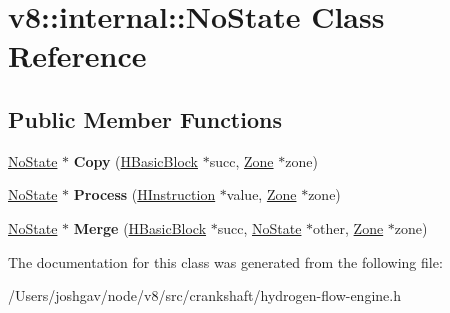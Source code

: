 \hypertarget{classv8_1_1internal_1_1_no_state}{}\section{v8\+:\+:internal\+:\+:No\+State Class Reference}
\label{classv8_1_1internal_1_1_no_state}
\subsection*{Public Member Functions}
\begin{DoxyCompactItemize}
\item 
\hyperlink{classv8_1_1internal_1_1_no_state}{No\+State} $\ast$ {\bfseries Copy} (\hyperlink{classv8_1_1internal_1_1_h_basic_block}{H\+Basic\+Block} $\ast$succ, \hyperlink{classv8_1_1internal_1_1_zone}{Zone} $\ast$zone)\hypertarget{classv8_1_1internal_1_1_no_state_aaadf2e07f1ad0411e869b0bbaf6b0c9e}{}\label{classv8_1_1internal_1_1_no_state_aaadf2e07f1ad0411e869b0bbaf6b0c9e}

\item 
\hyperlink{classv8_1_1internal_1_1_no_state}{No\+State} $\ast$ {\bfseries Process} (\hyperlink{classv8_1_1internal_1_1_h_instruction}{H\+Instruction} $\ast$value, \hyperlink{classv8_1_1internal_1_1_zone}{Zone} $\ast$zone)\hypertarget{classv8_1_1internal_1_1_no_state_a875e115daa326ce075cd255a56c4e999}{}\label{classv8_1_1internal_1_1_no_state_a875e115daa326ce075cd255a56c4e999}

\item 
\hyperlink{classv8_1_1internal_1_1_no_state}{No\+State} $\ast$ {\bfseries Merge} (\hyperlink{classv8_1_1internal_1_1_h_basic_block}{H\+Basic\+Block} $\ast$succ, \hyperlink{classv8_1_1internal_1_1_no_state}{No\+State} $\ast$other, \hyperlink{classv8_1_1internal_1_1_zone}{Zone} $\ast$zone)\hypertarget{classv8_1_1internal_1_1_no_state_a24c4643d3bf9434eb6da2fbda08791ab}{}\label{classv8_1_1internal_1_1_no_state_a24c4643d3bf9434eb6da2fbda08791ab}

\end{DoxyCompactItemize}


The documentation for this class was generated from the following file\+:\begin{DoxyCompactItemize}
\item 
/\+Users/joshgav/node/v8/src/crankshaft/hydrogen-\/flow-\/engine.\+h\end{DoxyCompactItemize}
